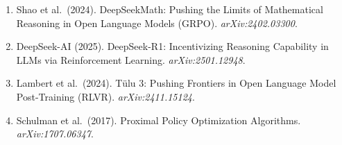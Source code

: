 \documentclass{article}
\begin{document}
\begin{enumerate}
  \item Shao et al.\ (2024). DeepSeekMath: Pushing the Limits of Mathematical Reasoning in Open Language Models (GRPO). \textit{arXiv:2402.03300}.
  \item DeepSeek-AI (2025). DeepSeek-R1: Incentivizing Reasoning Capability in LLMs via Reinforcement Learning. \textit{arXiv:2501.12948}.
  \item Lambert et al.\ (2024). T\"ulu 3: Pushing Frontiers in Open Language Model Post-Training (RLVR). \textit{arXiv:2411.15124}.
  \item Schulman et al.\ (2017). Proximal Policy Optimization Algorithms. \textit{arXiv:1707.06347}.
\end{enumerate}
\end{document}
